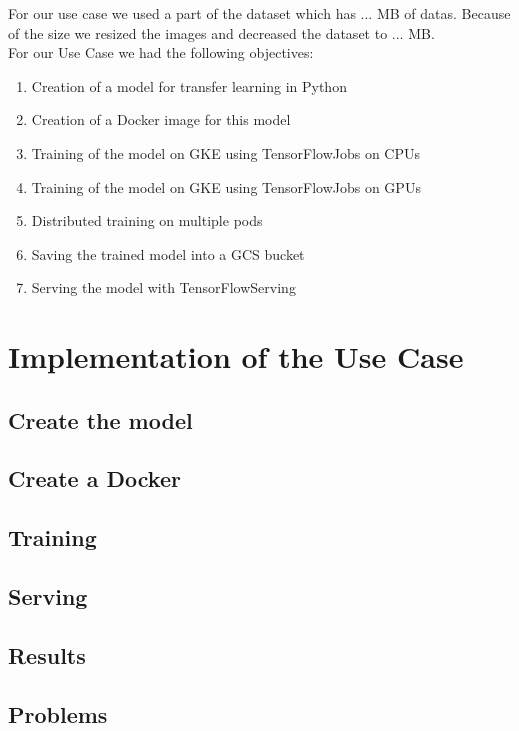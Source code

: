 \documentclass[12pt,a4paper]{scrartcl}		%
\begin{document}
\noindent For our use case we used a part of the dataset which has ... MB of datas. Because of the size we resized the images and decreased the dataset to ... MB.\\

\noindent For our Use Case we had the following objectives:
\begin{enumerate}
\item Creation of a model for transfer learning in Python
\item Creation of a Docker image for this model
\item Training of the model on GKE using TensorFlowJobs on CPUs
\item Training of the model on GKE using TensorFlowJobs on GPUs
\item Distributed training on multiple pods
\item Saving the trained model into a GCS bucket
\item Serving the model with TensorFlowServing
\end{enumerate}


\section{Implementation of the Use Case}



\subsection{Create the model}

\subsection{Create a Docker}

\subsection{Training}

\subsection{Serving}

\subsection{Results}

\subsection{Problems}
\end{document}

